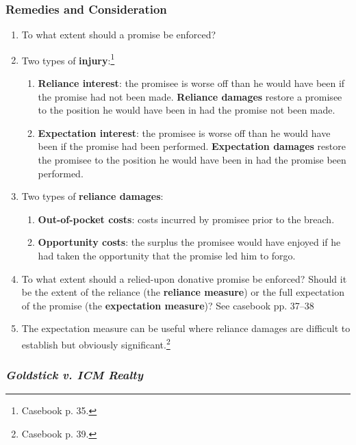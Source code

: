 \subsubsection{Remedies and Consideration}

\begin{enumerate}
    \item To what extent should a promise be enforced?
    \item Two types of \textbf{injury}:\footnote{Casebook p. 35.}
    \begin{enumerate}
        \item \textbf{Reliance interest}: the promisee is worse off than he 
        would have been if the promise had not been made. \textbf{Reliance 
        damages} restore a promisee to the position he would have been in had 
        the promise not been made. %
        \item \textbf{Expectation interest}: the promisee is worse off than he 
        would have been if the promise had been performed. \textbf{Expectation 
        damages} restore the promisee to the position he would have been in 
        had the promise been performed. %
    \end{enumerate}
    \item Two types of \textbf{reliance damages}:
    \begin{enumerate}
        \item \textbf{Out-of-pocket costs}: costs incurred by promisee prior 
        to the breach. %
        \item \textbf{Opportunity costs}: the surplus the promisee would have 
        enjoyed if he had taken the opportunity that the promise led him to 
        forgo.
    \end{enumerate}
    \item To what extent should a relied-upon donative promise be enforced? 
    Should it be the extent of the reliance (the \textbf{reliance measure}) or 
    the full expectation of the promise (the \textbf{expectation measure})? See 
    casebook pp. 37--38 %
    \item The expectation measure can be useful where reliance damages are 
    difficult to establish but obviously significant.\footnote{Casebook p. 39.}
\end{enumerate}

\subsubsection{\emph{Goldstick v. ICM Realty}}

